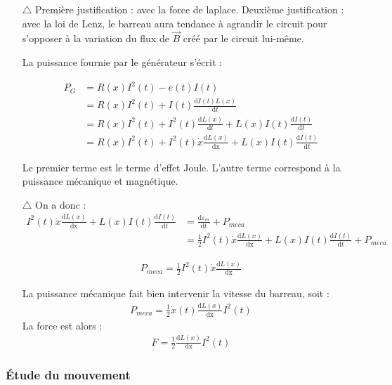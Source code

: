 \documentclass{report}
\begin{document}
\begin{itemize}

	\item[$\triangle$] Première justification : avec la force de laplace. Deuxième justification : avec la loi de Lenz, le barreau aura tendance à agrandir le circuit pour s'opposer à la variation du flux de $\vec{B}$ créé par le circuit lui-même.
	
	La puissance fournie par le générateur s'écrit :
	
	\begin{align*}
		P_G&=R(x)I^2(t)-e(t)I(t) \\
		&= R(x)I^2(t)+I(t)\frac{\mathrm{d}I(t)L(x)}{\mathrm{d}t} \\
		&= R(x)I^2(t)+I^2(t)\frac{\mathrm{d}L(x)}{\mathrm{d}t}+L(x)I(t)\frac{\mathrm{d}I(t)}{\mathrm{d}t} \\
		&= R(x)I^2(t)+I^2(t)\dot{x}\frac{\mathrm{d}L(x)}{\mathrm{dx}}+L(x)I(t)\frac{\mathrm{d}I(t)}{\mathrm{d}t}
	\end{align*}
	
Le premier terme est le terme d'effet Joule. L'autre terme correspond à la puissance mécanique et magnétique. 

\item[$\triangle$] On a donc :
\begin{align*}	
	I^2(t)\dot{x}\frac{\mathrm{d}L(x)}{\mathrm{dx}}+L(x)I(t)\frac{\mathrm{d}I(t)}{\mathrm{d}t} &= \frac{\mathrm{d}\varepsilon_{m}}{\mathrm{d}t} + P_{meca} \\
	&= \frac{1}{2}I^2(t)\dot{x}\frac{\mathrm{d}L(x)}{\mathrm{dx}} + L(x)I(t)\frac{\mathrm{d}I(t)}{\mathrm{d}t}+ P_{meca}
\end{align*}	
	
	\begin{align*}
		 P_{meca} = \frac{1}{2}I^2(t)\dot{x}\frac{\mathrm{d}L(x)}{\mathrm{dx}} 
	\end{align*}
	
	La puissance mécanique fait bien intervenir la vitesse du barreau, soit :
	\begin{align*}
		P_{meca}=\frac{1}{2}\dot{x}(t)\frac{\mathrm{d}L(x)}{\mathrm{dx}}I^2(t)
	\end{align*}	
La force est alors :
	\begin{align*}
		F=\frac{1}{2}\frac{\mathrm{d}L(x)}{\mathrm{dx}}I^2(t)
	\end{align*}	

\end{itemize}

\subsubsection*{Étude du mouvement}
\end{document}
